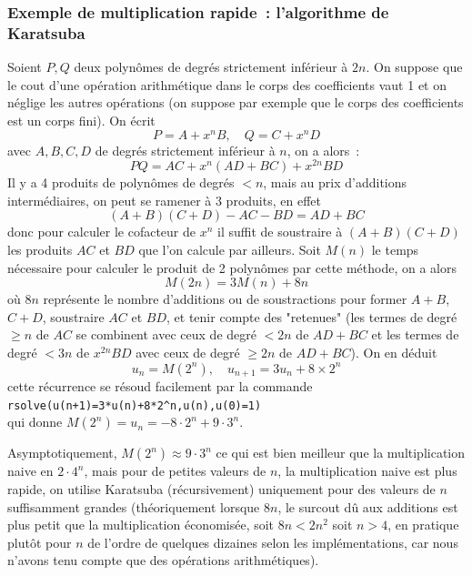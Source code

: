 \documentclass[a4paper,11pt]{article}
\begin{document}
\begin{giacjshere}
\subsubsection{Exemple de multiplication rapide~: l'algorithme de Karatsuba}
Soient $P, Q$ deux polyn\^omes de degr\'es strictement inf\'erieur \`a
$2n$. On suppose que le cout d'une op\'eration arithm\'etique dans le
corps des coefficients vaut 1 et on n\'eglige les autres
op\'erations (on suppose par exemple que le corps des coefficients
est un corps fini). On \'ecrit
\[ P=A+x^n B, \quad Q=C+x^n D\]
avec $A,B,C,D$ de degr\'es strictement inf\'erieur \`a $n$, on a
alors~:
$$ P Q = AC + x^n(AD+BC)+x^{2n} BD$$
Il y a 4 produits de polyn\^omes de degr\'es $<n$, mais au prix
d'additions interm\'ediaires, on peut se ramener \`a 3 produits, en
effet
$$ (A+B)(C+D)-AC-BD = AD+BC$$
donc pour calculer le cofacteur de $x^n$ il suffit de soustraire
\`a $(A+B)(C+D)$ les produits $AC$ et $BD$ que l'on calcule par
ailleurs.
Soit $M(n)$ le temps n\'ecessaire pour calculer le produit de 2
polyn\^omes par cette m\'ethode, on a alors
$$ M(2n) = 3M(n)+ 8n$$
o\`u $8n$ repr\'esente le nombre d'additions ou de soustractions
pour former $A+B$, $C+D$, soustraire $AC$ et $BD$, et tenir compte
des "retenues" (les termes de degr\'e $\geq n$ de $AC$ se combinent
avec ceux de degr\'e $<2n$ de $AD+BC$ et les termes de degr\'e $< 3n$
de $x^{2n}BD$ avec ceux de degr\'e $\geq 2n$ de $AD+BC$).
On en d\'eduit
$$ u_n=M(2^n), \quad u_{n+1}=3u_n+8 \times 2^n $$ 
cette r\'ecurrence se r\'esoud facilement par la commande\\
\verb|rsolve(u(n+1)=3*u(n)+8*2^n,u(n),u(0)=1)|\\
qui donne $M(2^n)=u_n=-8\cdot 2^{n}+9\cdot 3^{n}$.

Asymptotiquement, $M(2^n) \approx 9\cdot 3^{n}$ ce qui est bien
meilleur que la multiplication naive en $2 \cdot 4^n$, mais pour de
petites valeurs de $n$, la multiplication naive est plus rapide, on
utilise Karatsuba (r\'ecursivement) uniquement pour des valeurs de $n$
suffisamment grandes (th\'eoriquement lorsque $8n$, le surcout d\^u
aux additions est plus petit que la multiplication \'economis\'ee,
soit $8n<2n^2$ soit $n>4$, en pratique plut\^ot pour $n$ de l'ordre de quelques
dizaines selon les impl\'ementations, car nous n'avons tenu compte
que des op\'erations arithm\'etiques).


\end{giacjshere}
\end{document}
